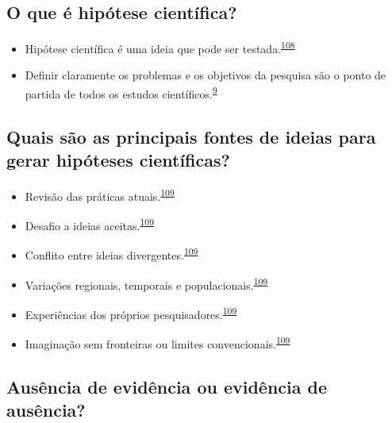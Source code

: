 \documentclass[
  a4paper,
]{book}
\begin{document}
\hypertarget{o-que-uxe9-hipuxf3tese-cientuxedfica}{%
\subsection{O que é hipótese científica?}\label{o-que-uxe9-hipuxf3tese-cientuxedfica}}

\begin{itemize}
\item
  Hipótese científica é uma ideia que pode ser testada.\textsuperscript{\protect\hyperlink{ref-Curran-Everett2009}{108}}
\item
  Definir claramente os problemas e os objetivos da pesquisa são o ponto de partida de todos os estudos científicos.\textsuperscript{\protect\hyperlink{ref-van2022a}{9}}
\end{itemize}

\hypertarget{quais-suxe3o-as-principais-fontes-de-ideias-para-gerar-hipuxf3teses-cientuxedficas}{%
\subsection{Quais são as principais fontes de ideias para gerar hipóteses científicas?}\label{quais-suxe3o-as-principais-fontes-de-ideias-para-gerar-hipuxf3teses-cientuxedficas}}

\begin{itemize}
\item
  Revisão das práticas atuais.\textsuperscript{\protect\hyperlink{ref-Vandenbroucke2018}{109}}
\item
  Desafio a ideias aceitas.\textsuperscript{\protect\hyperlink{ref-Vandenbroucke2018}{109}}
\item
  Conflito entre ideias divergentes.\textsuperscript{\protect\hyperlink{ref-Vandenbroucke2018}{109}}
\item
  Variações regionais, temporais e populacionais.\textsuperscript{\protect\hyperlink{ref-Vandenbroucke2018}{109}}
\item
  Experiências dos próprios pesquisadores.\textsuperscript{\protect\hyperlink{ref-Vandenbroucke2018}{109}}
\item
  Imaginação sem fronteiras ou limites convencionais.\textsuperscript{\protect\hyperlink{ref-Vandenbroucke2018}{109}}
\end{itemize}

\hypertarget{ausuxeancia-de-eviduxeancia-ou-eviduxeancia-de-ausuxeancia}{%
\subsection{Ausência de evidência ou evidência de ausência?}\label{ausuxeancia-de-eviduxeancia-ou-eviduxeancia-de-ausuxeancia}}
\end{document}
